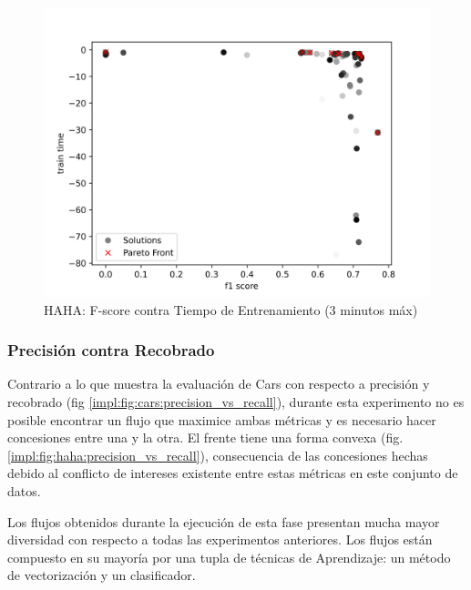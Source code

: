 \begin{figure}[ht]
    \centering
    \includegraphics[scale=0.65]{Pictures/haha_fscore_vs_time_3min.jpg}
    \caption{HAHA: F-score contra Tiempo de Entrenamiento (3 minutos m\'ax)}
    \label{impl:fig:haha:fscore_vs_time_3min}
\end{figure}

\subsubsection{Precisi\'on contra Recobrado}
Contrario a lo que muestra la evaluaci\'on de Cars con respecto a precisi\'on y recobrado (fig \ref{impl:fig:cars:precision_vs_recall}), durante esta experimento no es posible encontrar un flujo que maximice ambas m\'etricas y es necesario hacer concesiones entre una y la otra. El frente tiene una forma convexa (fig. \ref{impl:fig:haha:precision_vs_recall}), consecuencia de las concesiones hechas debido al conflicto de intereses existente entre estas m\'etricas en este conjunto de datos.

Los flujos obtenidos durante la ejecuci\'on de esta fase presentan mucha mayor diversidad con respecto a todas las experimentos anteriores. Los flujos est\'an compuesto en su mayor\'ia por una tupla de t\'ecnicas de Aprendizaje: un m\'etodo de vectorizaci\'on y un clasificador.

